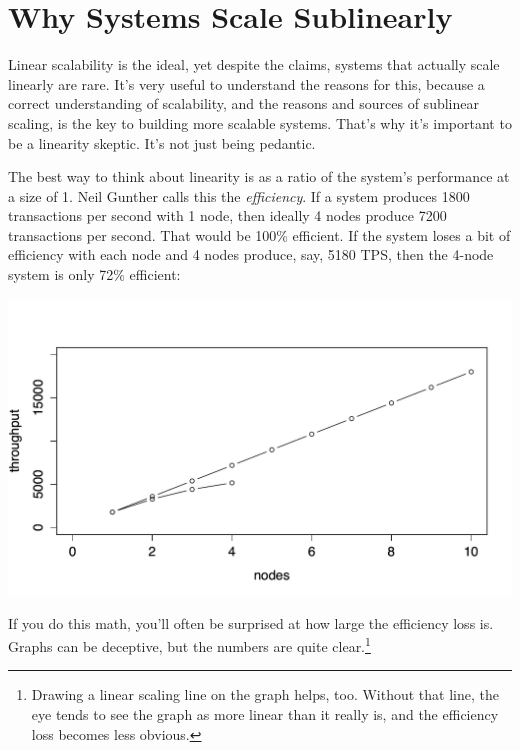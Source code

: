 \documentclass{vivid_layout}
\begin{document}
\section{Why Systems Scale Sublinearly}

Linear scalability is the ideal, yet despite the claims, systems that actually
scale linearly are rare.  It's very useful to understand the reasons for this,
because a correct understanding of scalability, and the reasons and sources of
sublinear scaling, is the key to building more scalable systems.  That's why
it's important to be a linearity skeptic.  It's not just being pedantic.

The best way to think about linearity is as a ratio of the system's performance
at a size of 1. Neil Gunther calls this the {\itshape efficiency}.
If a system produces 1800 transactions per second with 1 node, then ideally 4
nodes produce 7200 transactions per second. That would be 100\% efficient. If
the system loses a bit of efficiency with each node and 4 nodes produce, say,
5180 TPS, then the 4-node system is only 72\% efficient:
\begin{center}
\includegraphics[width=.85\linewidth]{scalability/linear2}
\end{center}
If you do this math, you'll often be surprised at how large the 
efficiency loss is.  Graphs can be deceptive, but the numbers are quite
clear.\footnote{Drawing a linear scaling line on the graph helps, too. Without
that line, the eye tends to see the graph as more linear than it really is, and
the efficiency loss becomes less obvious.}
\end{document}
